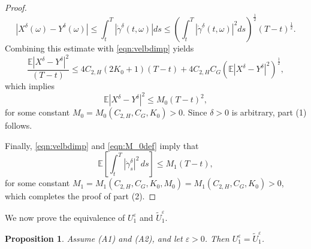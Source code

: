 \documentclass[reqno,11pt]{amsart}
\newtheorem{proposition}[theorem]{Proposition}
\numberwithin{equation}{section}
\newcommand{\e}{\varepsilon}
\newcommand{\ep}{\varepsilon}
\begin{document}
\begin{proof}
\[
    \left|X^\delta(\omega)-Y^\delta(\omega)\right|\leq \int_{t}^T \left|\dot{\gamma}^\delta(t,\omega)\right|ds \leq \left(\int_{t}^T\left|\dot{\gamma}^\delta (t,\omega)\right|^2
ds\right)^\frac{1}{2}(T-t)^\frac{1}{2}.
\]
Combining this estimate with \eqref{eqn:velbdimp} yields
\[
    \frac{\mathbb{E}\left|X^\delta-Y^\delta\right|^2} {(T-t)}\leq 4C_{2, H}(2K_0+1)(T-t)+ 4C_{2, H}C_G \left(\mathbb{E}\left|X^\delta-Y^\delta \right|^2\right)^\frac{1}{2},
\]
which implies
\begin{equation}\label{eqn:M_0def}
    \mathbb{E}\left|X^\delta-Y^\delta \right|^2 \leq M_0 (T-t)^2,
\end{equation}
for some constant $M_0=M_0(C_{2,H}, C_G, K_0)>0$. Since $\delta>0$ is arbitrary, part (1) follows.

Finally, \eqref{eqn:velbdimp} and \eqref{eqn:M_0def} imply that
\[
\mathbb{E}\left[\int_{t}^T|\dot{\gamma}^\delta_s|^2 \,ds\right] \leq M_1 (T-t),   \]
    for some constant $M_1=M_1(C_{2, H}, C_G, K_0, M_0)=M_1(C_{2, H}, C_G, K_0)>0$, which completes the proof of part (2).
\end{proof}
We now prove the equivalence of $U_1^\ep$ and $\tilde{U}_1^\ep$.


\begin{proposition}\label{prop:UeqU2}
     Assume (A1) and (A2), and let $\e>0$. Then $U_1^\ep=\tilde{U}_1^\ep$.
\end{proposition}
\end{document}
